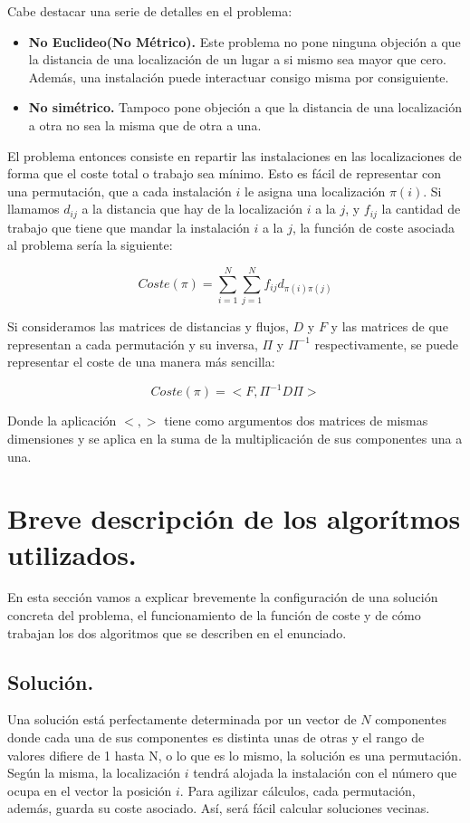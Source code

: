 Cabe destacar una serie de detalles en el problema:

\begin{itemize}
	\item \textbf{No Euclideo(No Métrico).} Este problema  no pone ninguna objeción a que la distancia de una localización de un lugar a si mismo sea mayor que cero. Además, una instalación puede interactuar consigo misma por consiguiente.
	\item \textbf{No simétrico.} Tampoco pone objeción a que la distancia de una localización a otra no sea la misma que de otra a una.
\end{itemize}

El problema entonces consiste en repartir las instalaciones en las localizaciones de forma que el coste total o trabajo sea mínimo. Esto es fácil de representar con una permutación, que a cada instalación $i$ le asigna una localización $\pi(i)$. Si llamamos $d_{ij}$ a la distancia que hay de la localización $i$ a la $j$, y $f_{ij}$ la cantidad de trabajo que tiene que mandar la instalación $i$ a la $j$, la función de coste asociada al problema sería la siguiente:

\[Coste(\pi)=\sum_{i=1}^{N}\sum_{j=1}^{N}f_{ij}d_{\pi(i)\pi(j)}\]

Si consideramos las matrices de distancias y flujos, $D$ y $F$ y las matrices de que representan a cada permutación y su inversa, $\Pi$ y $\Pi^{-1}$ respectivamente, se puede representar el coste de una manera más sencilla:

\[Coste(\pi)=<F,\Pi^{-1}D\Pi> \]

Donde la aplicación $<,>$ tiene como argumentos dos matrices de mismas dimensiones y se aplica en la suma de la multiplicación de sus componentes una a una. 

\newpage

\section{Breve descripción de los algorítmos utilizados.}
En esta sección vamos a explicar brevemente la configuración de una solución concreta del problema, el funcionamiento de la función de coste y de cómo trabajan los dos algoritmos que se describen en el enunciado.

\subsection{Solución.}

Una solución está perfectamente determinada por un vector de $N$ componentes donde cada una de sus componentes es distinta unas de otras y el rango de valores difiere de 1 hasta N, o lo que es lo mismo, la solución es una permutación. Según la misma, la localización $i$ tendrá alojada la instalación con el número que ocupa en el vector la posición $i$. Para agilizar cálculos, cada permutación, además, guarda su coste asociado. Así, será fácil calcular soluciones vecinas.


